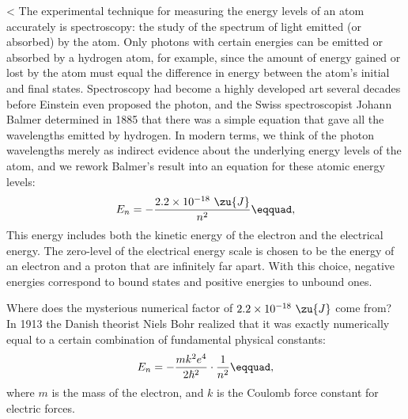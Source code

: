 <%
The experimental technique for measuring the energy levels
of an atom accurately is spectroscopy: the study of the
spectrum of light emitted (or absorbed) by the atom. Only
photons with certain energies can be emitted or absorbed by
a hydrogen atom, for example, since the amount of energy
gained or lost by the atom must equal the difference in
energy between the atom's initial and final states.
Spectroscopy had become a highly developed art
several decades before Einstein even proposed the photon,
and the Swiss spectroscopist Johann Balmer
determined in 1885 that there was a simple equation that
gave all the wavelengths emitted by hydrogen. In modern
terms, we think of the photon wavelengths merely as indirect
evidence about the underlying energy levels of the atom, and
we rework Balmer's result into an equation for these
atomic energy levels:
\begin{equation*}
                E_n    =  -\frac{2.2\times10^{-18}\ \zu{J}}{n^2}\eqquad,  
\end{equation*}
This energy includes both
the kinetic energy of the electron and the electrical
energy. The zero-level of the electrical energy
scale is chosen to be the energy of an electron and a proton
that are infinitely far apart. With this choice, negative
energies correspond to bound states and positive energies to unbound ones.

Where does the mysterious numerical factor of $2.2\times10^{-18}\ \zu{J}$
come from? In 1913 the Danish theorist Niels Bohr
realized that it was exactly numerically equal to a certain
combination of fundamental physical constants:
\begin{equation*}
 E_n = -\frac{mk^2e^4}{2\hbar^2}\cdot\frac{1}{n^2}\eqquad,  
\end{equation*}
where $m$ is the mass of the electron,  and $k$ is the Coulomb
force constant for electric forces.

